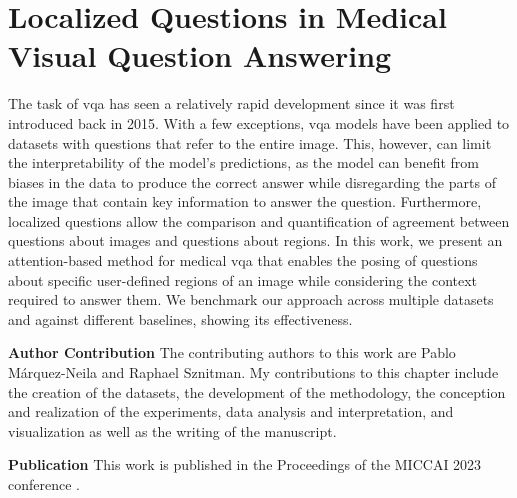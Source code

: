 \chapter{Localized Questions in Medical Visual Question Answering}
\label{chapter:locvqa}

The task of \gls{vqa} has seen a relatively rapid development since it was first introduced back in 2015. With a few exceptions, \gls{vqa} models have been applied to datasets with questions that refer to the entire image. This, however, can limit the interpretability of the model's predictions, as the model can benefit from biases in the data to produce the correct answer while disregarding the parts of the image that contain key information to answer the question. Furthermore, localized questions allow the comparison and quantification of agreement between questions about images and questions about regions. In this work, we present an attention-based method for medical \gls{vqa} that enables the posing of questions about specific user-defined regions of an image while considering the context required to answer them. We benchmark our approach across multiple datasets and against different baselines, showing its effectiveness. 

\textbf{Author Contribution} The contributing authors to this work are Pablo Márquez-Neila and Raphael Sznitman. My contributions to this chapter include the creation of the datasets, the development of the methodology, the conception and realization of the experiments, data analysis and interpretation, and visualization as well as the writing of the manuscript.

\textbf{Publication}  This work is published in the Proceedings of the MICCAI 2023 conference \cite{tascon2023localized}.

\newpage












